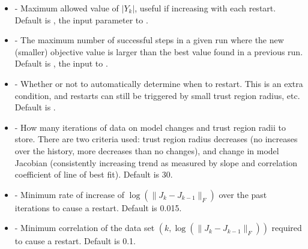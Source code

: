 \documentclass[letterpaper,10pt,english]{sphinxmanual}
\begin{document}
\begin{itemize}
\item {} 
 - Maximum allowed value of \(|Y_k|\), useful if increasing with each restart. Default is , the input parameter to .

\item {} 
 - The maximum number of successful steps in a given run where the new (smaller) objective value is larger than the best value found in a previous run. Default is , the input to .

\item {} 
 - Whether or not to automatically determine when to restart. This is an extra condition, and restarts can still be triggered by small trust region radius, etc. Default is .

\item {} 
 - How many iterations of data on model changes and trust region radii to store. There are two criteria used: trust region radius decreases (no increases over the history, more decreases than no changes), and change in model Jacobian (consistently increasing trend as measured by slope and correlation coefficient of line of best fit). Default is 30.

\item {} 
 - Minimum rate of increase of \(\log(\|J_k-J_{k-1}\|_F)\) over the past iterations to cause a restart. Default is 0.015.

\item {} 
 - Minimum correlation of the data set \((k, \log(\|J_k-J_{k-1}\|_F))\) required to cause a restart. Default is 0.1.

\end{itemize}
\end{document}
